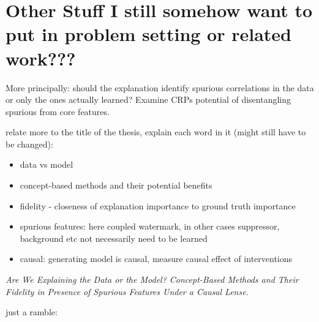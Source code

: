 { \color{gray}


\section{Other Stuff I still somehow want to put in problem setting or related work???}

More principally: should the explanation identify spurious correlations in the data or only the ones actually learned?
Examine CRPs potential of disentangling spurious from core features.


relate more to the title of the thesis, explain each word in it (might still have to be changed):
\begin{itemize}
    \item data vs model
    \item concept-based methods and their potential benefits
    \item fidelity - closeness of explanation importance to ground truth importance
    \item spurious features: here coupled watermark, in other cases suppressor, background etc not necessarily need to be learned
    \item causal: generating model is causal, measure causal effect of interventions
\end{itemize}

\textit{Are We Explaining the Data or the Model?
    Concept-Based Methods and Their Fidelity in Presence of Spurious Features Under a Causal Lense.}

just a ramble:

}
